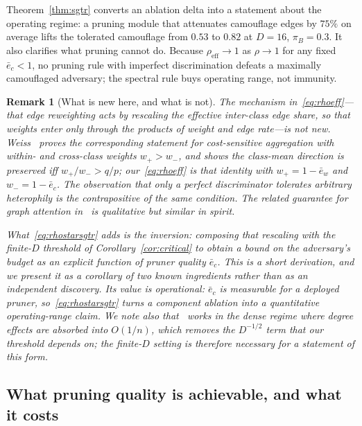 \documentclass[onecolumn,pdflatex,sn-basic,Numbered]{sn-jnl}
\theoremstyle{thmstyleone}
\theoremstyle{thmstylethree}
\newtheorem{remark}[theorem]{Remark}
\begin{document}
Theorem~\ref{thm:sgtr} converts an ablation delta into a statement about the
operating regime: a pruning module that attenuates camouflage edges by $75\%$ on
average lifts the tolerated camouflage from $0.53$ to $0.82$ at $D=16$,
$\pi_B = 0.3$. It also clarifies what pruning cannot do. Because
$\rho_{\mathrm{eff}} \to 1$ as $\rho \to 1$ for any fixed $\bar e_c < 1$, no
pruning rule with imperfect discrimination defeats a maximally camouflaged
adversary; the spectral rule buys operating range, not immunity.

\begin{remark}[What is new here, and what is not]
\label{rem:sgtr-priority}
The \emph{mechanism} in~\eqref{eq:rhoeff}---that edge reweighting acts by rescaling
the effective inter-class edge share, so that weights enter only through the products
of weight and edge rate---is not new. Weiss~\citep[Thm.~2]{weiss2026cost} proves the
corresponding statement for cost-sensitive aggregation with within- and
cross-class weights $w_+ > w_-$, and shows the class-mean direction is preserved iff
$w_+/w_- > q/p$; our~\eqref{eq:rhoeff} is that identity with $w_+ = 1-\bar e_w$ and
$w_- = 1-\bar e_c$. The observation that only a perfect discriminator tolerates
arbitrary heterophily is the contrapositive of the same condition. The related
guarantee for graph attention in~\citep{fountoulakis2023graph} is qualitative but
similar in spirit.

What~\eqref{eq:rhostarsgtr} adds is the \emph{inversion}: composing that rescaling
with the finite-$D$ threshold of Corollary~\ref{cor:critical} to obtain a bound on the
\emph{adversary's} budget as an explicit function of pruner quality $\bar e_c$. This
is a short derivation, and we present it as a corollary of two known ingredients
rather than as an independent discovery. Its value is operational: $\bar e_c$ is
measurable for a deployed pruner, so~\eqref{eq:rhostarsgtr} turns a component
ablation into a quantitative operating-range claim. We note also
that~\citep{weiss2026cost} works in the dense regime where degree effects are absorbed
into $O(1/n)$, which removes the $D^{-1/2}$ term that our threshold depends on; the
finite-$D$ setting is therefore necessary for a statement of this form.
\end{remark}

\subsection{What pruning quality is achievable, and what it costs}
\label{sec:achievable}
\end{document}
